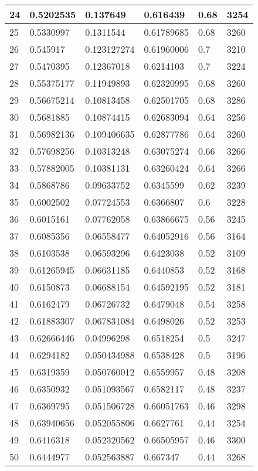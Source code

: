 \begin{longtable}{|l|l|l|l|l|l|}
24 & 0.5202535 & 0.137649 & 0.616439 & 0.68 & 3254 \\ \hline 
25 & 0.5330997 & 0.1311544 & 0.61789685 & 0.68 & 3260 \\ \hline 
26 & 0.545917 & 0.123127274 & 0.61960006 & 0.7 & 3210 \\ \hline 
27 & 0.5470395 & 0.12367018 & 0.6214103 & 0.7 & 3224 \\ \hline 
28 & 0.55375177 & 0.11949893 & 0.62320995 & 0.68 & 3260 \\ \hline 
29 & 0.56675214 & 0.10813458 & 0.62501705 & 0.68 & 3286 \\ \hline 
30 & 0.5681885 & 0.10874415 & 0.62683094 & 0.64 & 3256 \\ \hline 
31 & 0.56982136 & 0.109406635 & 0.62877786 & 0.64 & 3260 \\ \hline 
32 & 0.57698256 & 0.10313248 & 0.63075274 & 0.66 & 3266 \\ \hline 
33 & 0.57882005 & 0.10381131 & 0.63260424 & 0.64 & 3266 \\ \hline 
34 & 0.5868786 & 0.09633752 & 0.6345599 & 0.62 & 3239 \\ \hline 
35 & 0.6002502 & 0.07724553 & 0.6366807 & 0.6 & 3228 \\ \hline 
36 & 0.6015161 & 0.07762058 & 0.63866675 & 0.56 & 3245 \\ \hline 
37 & 0.6085356 & 0.06558477 & 0.64052916 & 0.56 & 3164 \\ \hline 
38 & 0.6103538 & 0.06593296 & 0.6423038 & 0.52 & 3109 \\ \hline 
39 & 0.61265945 & 0.06631185 & 0.6440853 & 0.52 & 3168 \\ \hline 
40 & 0.6150873 & 0.06688154 & 0.64592195 & 0.52 & 3181 \\ \hline 
41 & 0.6162479 & 0.06726732 & 0.6479048 & 0.54 & 3258 \\ \hline 
42 & 0.61883307 & 0.067831084 & 0.6498026 & 0.52 & 3253 \\ \hline 
43 & 0.62666446 & 0.04996298 & 0.6518254 & 0.5 & 3247 \\ \hline 
44 & 0.6294182 & 0.050434988 & 0.6538428 & 0.5 & 3196 \\ \hline 
45 & 0.6319359 & 0.050760012 & 0.6559957 & 0.48 & 3208 \\ \hline 
46 & 0.6350932 & 0.051093567 & 0.6582117 & 0.48 & 3237 \\ \hline 
47 & 0.6369795 & 0.051506728 & 0.66051763 & 0.46 & 3298 \\ \hline 
48 & 0.63940656 & 0.052055806 & 0.6627761 & 0.44 & 3254 \\ \hline 
49 & 0.6416318 & 0.052320562 & 0.66505957 & 0.46 & 3300 \\ \hline 
50 & 0.6444977 & 0.052563887 & 0.667347 & 0.44 & 3268 \\ \hline 
\end{longtable}